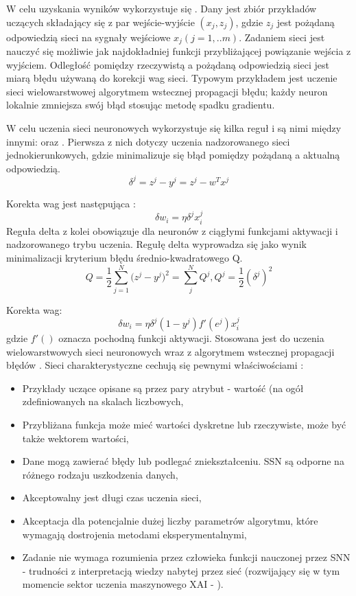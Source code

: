 W celu uzyskania wyników wykorzystuje się . Dany jest zbiór przykładów uczących składający się z par wejście-wyjście $(x_{j}, z_{j})$, gdzie $z_{j}$ jest pożądaną odpowiedzią sieci na sygnały wejściowe $x_{j} (j=1,..m)$. Zadaniem sieci jest nauczyć się możliwie jak najdokładniej funkcji przybliżającej powiązanie wejścia z wyjściem. Odległość pomiędzy rzeczywistą a pożądaną odpowiedzią sieci jest
miarą błędu używaną do korekcji wag sieci. Typowym przykładem jest uczenie sieci wielowarstwowej algorytmem wstecznej propagacji błędu; każdy neuron lokalnie zmniejsza swój błąd stosując metodę spadku gradientu.

W celu uczenia sieci neuronowych wykorzystuje się kilka reguł i są nimi między innymi:  oraz . Pierwsza z nich dotyczy uczenia nadzorowanego sieci jednokierunkowych, gdzie minimalizuje się błąd pomiędzy pożądaną a aktualną odpowiedzią. 
\[
\delta^{j} = z^{j} - y^{j} = z^{j} - w^{T}x^{j}
\]

Korekta wag jest następująca \cite{Widrow}:
\begin{equation}
\label{eqn:delta}
\delta w_{i} = \eta \delta^{j} x^{j}_{i}
\end{equation}
Reguła delta z kolei obowiązuje dla neuronów z ciągłymi funkcjami aktywacji i nadzorowanego trybu uczenia. Regułę delta wyprowadza się jako wynik minimalizacji kryterium błędu średnio-kwadratowego Q.
\[
    Q = \frac{1}{2}\sum_{j=1}^{N} \big( z^{j} - y^{j}\big)^{2} = \sum_{j}^{N}Q^{j}, Q^{j} = \frac{1}{2}(\delta^{j})^{2}
\]

Korekta wag:
\[
\delta w_{i} = \eta \delta^{j} (1 - y^{j}) f'(e^{j}) x^{j}_{i}
\]
gdzie $f'()$ oznacza pochodną funkcji aktywacji. Stosowana jest do uczenia wielowarstwowych sieci neuronowych wraz z algorytmem wstecznej propagacji błędów \cite{Rumelhart}. Sieci charakterystyczne cechują się pewnymi właściwościami \cite{Mitchell}:
\begin{itemize}
    \item Przykłady uczące opisane są przez pary atrybut - wartość (na ogół
zdefiniowanych na skalach liczbowych,
    \item Przybliżana funkcja może mieć wartości dyskretne lub rzeczywiste,
może być także wektorem wartości,
 \item Dane mogą zawierać błędy lub podlegać zniekształceniu. SSN są
odporne na różnego rodzaju uszkodzenia danych, 
    \item Akceptowalny jest długi czas uczenia sieci,
    \item Akceptacja dla potencjalnie dużej liczby parametrów algorytmu,
które wymagają dostrojenia metodami eksperymentalnymi,
    \item Zadanie nie wymaga rozumienia przez człowieka funkcji
nauczonej przez SNN - trudności z interpretacją wiedzy nabytej
przez sieć (rozwijający się w tym momencie sektor uczenia maszynowego XAI - ).
\end{itemize}

